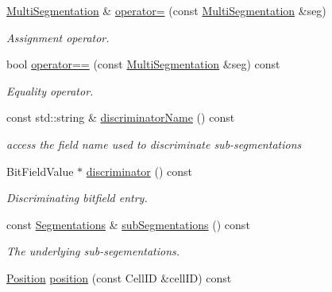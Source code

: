 \begin{DoxyCompactItemize}
\hyperlink{class_d_d4hep_1_1_geometry_1_1_multi_segmentation}{MultiSegmentation} \& \hyperlink{class_d_d4hep_1_1_geometry_1_1_multi_segmentation_a71f8f2f78a2f3054f67c4aff149c6137}{operator=} (const \hyperlink{class_d_d4hep_1_1_geometry_1_1_multi_segmentation}{MultiSegmentation} \&seg)
\begin{DoxyCompactList}\small\item\em Assignment operator. \item\end{DoxyCompactList}\item 
bool \hyperlink{class_d_d4hep_1_1_geometry_1_1_multi_segmentation_a4c49fe036eda4b83a03ae28bd2592b6f}{operator==} (const \hyperlink{class_d_d4hep_1_1_geometry_1_1_multi_segmentation}{MultiSegmentation} \&seg) const 
\begin{DoxyCompactList}\small\item\em Equality operator. \item\end{DoxyCompactList}\item 
const std::string \& \hyperlink{class_d_d4hep_1_1_geometry_1_1_multi_segmentation_a21a3cade54354ef637fb9f72c19e536d}{discriminatorName} () const 
\begin{DoxyCompactList}\small\item\em access the field name used to discriminate sub-\/segmentations \item\end{DoxyCompactList}\item 
BitFieldValue $\ast$ \hyperlink{class_d_d4hep_1_1_geometry_1_1_multi_segmentation_af270c789eedbe8a2a4fe830d2c43e20d}{discriminator} () const 
\begin{DoxyCompactList}\small\item\em Discriminating bitfield entry. \item\end{DoxyCompactList}\item 
const \hyperlink{class_d_d4hep_1_1_geometry_1_1_multi_segmentation_ae2c7165290144f20af27248eab1858c5}{Segmentations} \& \hyperlink{class_d_d4hep_1_1_geometry_1_1_multi_segmentation_a8a9d4ff9ae316833f1f8467152b7439a}{subSegmentations} () const 
\begin{DoxyCompactList}\small\item\em The underlying sub-\/segementations. \item\end{DoxyCompactList}\item 
\hyperlink{namespace_d_d4hep_1_1_geometry_a55083902099d03506c6db01b80404900}{Position} \hyperlink{class_d_d4hep_1_1_geometry_1_1_multi_segmentation_a3d35ba15f395f90d54d33d39b82587b9}{position} (const CellID \&cellID) const 

\end{DoxyCompactItemize}
